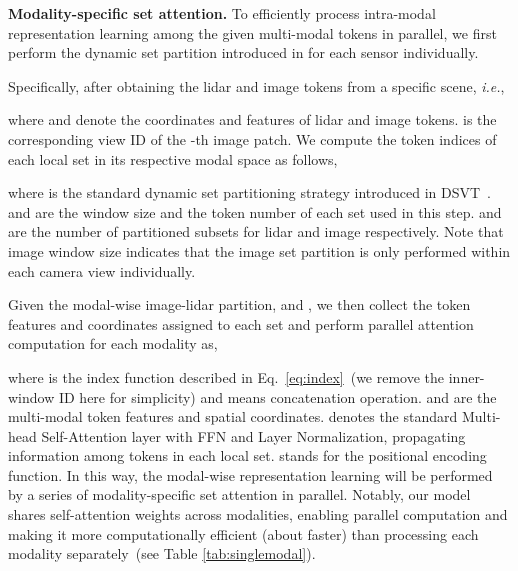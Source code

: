\documentclass[10pt,twocolumn,letterpaper]{article}
\begin{document}
\noindent \textbf{Modality-specific set attention.} To efficiently process intra-modal representation learning among the given multi-modal tokens in parallel, we first perform the dynamic set partition introduced in \cite{wang2023dsvt} for each sensor individually.

Specifically, after obtaining the lidar and image tokens from a specific scene, \textit{i.e.},
\vspace{-3pt}

where  and  denote the coordinates and features of lidar and image tokens.   is the corresponding view ID of the -th image patch. We compute the token indices of each local set in its respective modal space as follows,
\vspace{-3pt}

where  is the standard dynamic set partitioning strategy introduced in DSVT~\cite{wang2023dsvt}.  and  are the window size and the token number of each set used in this step.  and  are the number of partitioned subsets for lidar and image respectively. Note that image window size  indicates that the image set partition is only performed within each camera view individually.

Given the modal-wise image-lidar partition,  and , we then collect the token features and coordinates assigned to each set and perform parallel attention computation for each modality as,
\vspace{-3pt}

where  is the index function described in Eq.~\eqref{eq:index}~(we remove the inner-window ID here for simplicity) and  means concatenation operation.  and  are the multi-modal token features and spatial coordinates.  denotes the standard Multi-head Self-Attention layer with FFN and Layer Normalization, propagating information among  tokens in each local set.  stands for the positional encoding function. In this way, the modal-wise representation learning will be performed by a series of modality-specific set attention in parallel. Notably, our model shares self-attention weights across modalities, enabling parallel computation and making it more computationally efficient (about  faster) than processing each modality separately~(see Table \ref{tab:singlemodal}).
\end{document}
